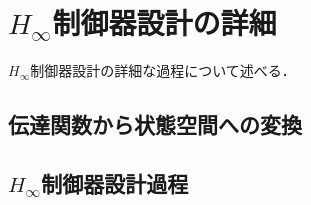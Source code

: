 \chapter{$H_\infty$制御器設計の詳細}
$H_\infty$制御器設計の詳細な過程について述べる．
\section{伝達関数から状態空間への変換}
\label{sec:tf2ss}
\section{$H_\infty$制御器設計過程}
\label{sec:Hinfty_sekkei}